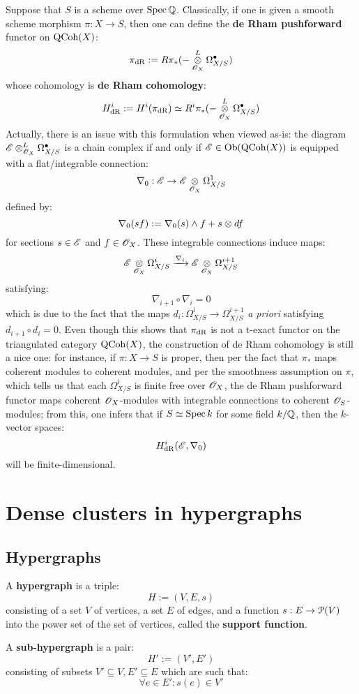         Suppose that $S$ is a scheme over $\operatorname{Spec} \mathbb{Q}$. Classically, if one is given a smooth scheme morphism $\pi: X \to S$, then one can define the \textbf{de Rham pushforward} functor on $\mathrm{QCoh}(X)$:
            $$\pi_{\dR} := R\pi_*(- \tensor_{\scrO_X}^L \Omega_{X/S}^{\bullet})$$
        whose cohomology is \textbf{de Rham cohomology}:
            $$H^i_{\dR} := H^i(\pi_{\dR}) \cong R^i\pi_*(- \tensor_{\scrO_X}^L \Omega_{X/S}^{\bullet})$$
        Actually, there is an issue with this formulation when viewed as-is: the diagram $\scrE \tensor_{\scrO_X}^L \Omega_{X/S}^{\bullet}$ is a chain complex if and only if $\mathscr{E} \in \mathrm{Ob}(\mathrm{QCoh}(X))$ is equipped with a flat/integrable connection:
            $$\nabla_0: \scrE \to \scrE \tensor_{\scrO_X} \Omega^1_{X/S}$$
        defined by:
            $$\nabla_0(s f) := \nabla_0(s) \wedge f + s \tensor d f$$
        for sections $s \in \mathscr{E}$ and $f \in \mathscr{O}_X$. These integrable connections induce maps:
            $$\scrE \tensor_{\scrO_X} \Omega_{X/S}^i \xrightarrow[]{\nabla_i} \scrE \tensor_{\scrO_X} \Omega_{X/S}^{i + 1}$$
        satisfying:
            $$\nabla_{i + 1} \circ \nabla_i = 0$$
        which is due to the fact that the maps $d_i: \Omega^i_{X/S} \to \Omega^{i + 1}_{X/S}$ \textit{a priori} satisfying $d_{i + 1} \circ d_i = 0$. Even though this shows that $\pi_{\mathrm{dR}}$ is not a t-exact functor on the triangulated category $\mathrm{QCoh}(X)$, the construction of de Rham cohomology is still a nice one: for instance, if $\pi: X \to S$ is proper, then per the fact that $\pi_*$ maps coherent modules to coherent modules, and per the smoothness assumption on $\pi$, which tells us that each $\Omega_{X/S}^i$ is finite free over $\mathscr{O}_X$, the de Rham pushforward functor maps coherent $\mathscr{O}_X$-modules with integrable connections to coherent $\mathscr{O}_S$-modules; from this, one infers that if $S \simeq \operatorname{Spec} k$ for some field $k/\mathbb{Q}$, then the $k$-vector spaces:
            $$H_{\mathrm{dR}}^i(\mathscr{E}, \nabla_0)$$
        will be finite-dimensional.

    \section{Dense clusters in hypergraphs}
        \subsection{Hypergraphs}
            \begin{definition}[Hypergraphs] \label{def: hypergraphs}
                A \textbf{hypergraph} is a triple:
                    $$H := (V, E, s)$$
                consisting of a set $V$ of vertices, a set $E$ of edges, and a function $s: E \to \mathcal{P}(V)$ into the power set of the set of vertices, called the \textbf{support function}.

                A \textbf{sub-hypergraph} is a pair:
                    $$H' := (V', E')$$
                consisting of subsets $V' \subseteq V, E' \subseteq E$ which are such that:
                    $$\forall e \in E': s(e) \in V'$$
            \end{definition}

